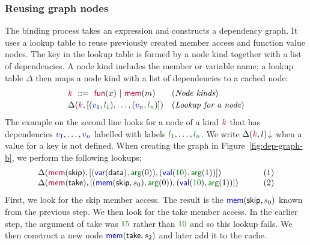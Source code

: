 \documentclass[english,submission]{programming}
\theoremstyle{plain}
\theoremstyle{definition}
\newcommand{\num}[1]{\textcolor{numclr}{#1}}
\newcommand{\ident}[1]{\textnormal{\textcolor{idclr}{\sffamily #1}}}
\newcommand{\bndclr}[1]{\textcolor{kvdclr}{#1}}
\newcommand{\bkndclr}[1]{\textcolor{prepclr}{#1}}
\newcommand{\blblclr}[1]{\textcolor{numclr}{#1}}
\newcommand{\bnd}[1]{\textnormal{\textcolor{kvdclr}{\sffamily #1}}}
\newcommand{\bknd}[1]{\textnormal{\textcolor{prepclr}{\sffamily #1}}}
\newcommand{\blbl}[1]{\textnormal{\textcolor{numclr}{\sffamily #1}}}
\begin{document}

\subsubsection{Reusing graph nodes}
The binding process takes an expression and constructs a dependency graph.
It uses a lookup table to reuse previously created member access and function value nodes. The key
in the lookup table is formed by a node kind together with a list of dependencies. A node kind
includes the member or variable name; a lookup table $\Delta$ then maps a node kind with a list
of dependencies to a cached node:
%
\begin{equation*}
\begin{array}{ll}
\bkndclr{k}~::=~\bknd{fun}(x)~|~\bknd{mem}(m)&(\textit{Node kinds})\\[0.2em]
\Delta(\bkndclr{k}, [(\bndclr{v_1},\blblclr{l_1}), \ldots, (\bndclr{v_n},\blblclr{l_n})])  & (\textit{Lookup for a node})
\end{array}
\end{equation*}
%
The example on the second line looks for a node of a kind $\bkndclr{k}$ that has dependencies
$\bndclr{v_1}, \ldots, \bndclr{v_n}$ labelled with labels $\blblclr{l_1}, \ldots, \blblclr{l_n}$.
We write $\Delta(\bkndclr{k}, l)\!\downarrow$ when a value for a key is not defined.
When creating the graph in Figure~\ref{fig:dep-graph-b},
we perform the following lookups:
%
\begin{equation*}
\begin{array}{ll}
\Delta(\bknd{mem}(\ident{skip}), [(\bnd{var}(\ident{data}),\blbl{arg}(0)), (\bnd{val}(\num{10}), \blbl{arg}(1))]) &\qquad(1)\\
\Delta(\bknd{mem}(\ident{take}), [(\bnd{mem}(\ident{skip}, s_0),\blbl{arg}(0)), (\bnd{val}(\num{10}), \blbl{arg}(1))]) &\qquad(2)
\end{array}
\end{equation*}
%
First, we look for the \ident{skip} member access. The result is the $\bnd{mem}(\ident{skip}, s_0)$
known from the previous step. We then look for the \ident{take} member access. In the earlier
step, the argument of \ident{take} was $\num{15}$ rather than $\num{10}$ and so this lookup fails.
We then construct a new node $\bnd{mem}(\ident{take}, s_2)$ and later add it to the cache.

\end{document}
